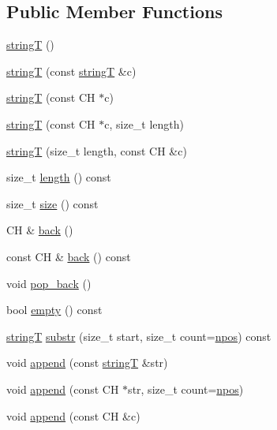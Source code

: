 \subsection*{Public Member Functions}
\begin{DoxyCompactItemize}
\item 
\hyperlink{classfm_1_1stringT_a56c133a60e7f887de619ad25a5d0b963}{stringT} ()
\item 
\hyperlink{classfm_1_1stringT_a7c06e01d02b66968a373a33af588a433}{stringT} (const \hyperlink{classfm_1_1stringT}{stringT} \&c)
\item 
\hyperlink{classfm_1_1stringT_a3e97fc4b0345bd5aa92118ab1ae0317c}{stringT} (const CH $\ast$c)
\item 
\hyperlink{classfm_1_1stringT_afbe97870ca339f44ec385c6684cc8801}{stringT} (const CH $\ast$c, size\_\-t length)
\item 
\hyperlink{classfm_1_1stringT_aace85e03d06a153d4d4e6dec01afe58f}{stringT} (size\_\-t length, const CH \&c)
\item 
size\_\-t \hyperlink{classfm_1_1stringT_a425f6432dc99ce3d69ef38042da0199c}{length} () const 
\item 
size\_\-t \hyperlink{classfm_1_1stringT_a49fedbf1c9571085f7c7e86165a6c712}{size} () const 
\item 
CH \& \hyperlink{classfm_1_1stringT_a37f0360675874b9aee111cc22032084c}{back} ()
\item 
const CH \& \hyperlink{classfm_1_1stringT_a91400114824cfbd08097df5742c37b5a}{back} () const 
\item 
void \hyperlink{classfm_1_1stringT_a388ddb825778caff9611fca9595aace1}{pop\_\-back} ()
\item 
bool \hyperlink{classfm_1_1stringT_a7715ab1c61a325298c7aa4bef9a6e792}{empty} () const 
\item 
\hyperlink{classfm_1_1stringT}{stringT} \hyperlink{classfm_1_1stringT_a0c3cb08b82cdb2da916b9618c3ca163d}{substr} (size\_\-t start, size\_\-t count=\hyperlink{classfm_1_1stringT_a1713528ab4d3f25c806389871be1a04f}{npos}) const 
\item 
void \hyperlink{classfm_1_1stringT_acc64b4264fad882b875b417b632abbe9}{append} (const \hyperlink{classfm_1_1stringT}{stringT} \&str)
\item 
void \hyperlink{classfm_1_1stringT_a8283d6efe9c952697df4fbd5cd192273}{append} (const CH $\ast$str, size\_\-t count=\hyperlink{classfm_1_1stringT_a1713528ab4d3f25c806389871be1a04f}{npos})
\item 
void \hyperlink{classfm_1_1stringT_ae065223270ff4511a2f6f09c9a38f89a}{append} (const CH \&c)

\end{DoxyCompactItemize}
